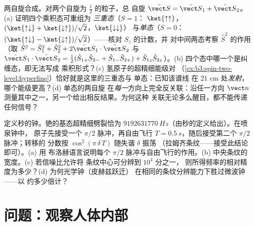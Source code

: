 \begin{exercise}[$\star\star\star$]\label{exo:b3:spin-two-level:11}
两自旋合成。对两个自旋为 $\tfrac12$ 的粒子，总
自旋 $\hat{\vect S} = \hat{\vect S}_1 + \hat{\vect S}_2$。(a) 证明四个乘积态可重组为
\emph{三重态}（$S = 1$：
$\ket{\uparrow\uparrow}$，$(\ket{\uparrow\downarrow} +
\ket{\downarrow\uparrow})/\sqrt2$，$\ket{\downarrow\downarrow}$）
与\emph{单态}（$S = 0$：$(\ket{\uparrow\downarrow} -
\ket{\downarrow\uparrow})/\sqrt2$）——核对 $S_z$ 的计数，并
对中间两态考察 $\hat S^2$ 的作用（取 $\hat
S^2 = \hat S_1^2 + \hat S_2^2 + 2\hat{\vect S}_1\cdot\hat{\vect
S}_2$ 与 $\hat{\vect S}_1\cdot\hat{\vect S}_2 = \tfrac12(\hat
S_{1+}\hat S_{2-} + \hat S_{1-}\hat S_{2+}) + \hat S_{1z}\hat
S_{2z}$）。(b) 四个态中哪一个是纠缠态，即无法写成
乘积形式？(c) 氢原子的超精细能级对
（\cref{ex:b3:spin-two-level:hyperfine}）恰好就是这里的三重态与
单态：已知该谱线
在 21 cm 处\emph{发射}，哪个能级更高？(d) 单态的两自旋
在\emph{每一}方向上完全反关联：沿任一方向
$\vect n$ 测量其中之一，另一个给出相反结果。为何这种
关联无论多么醒目，都不能传递任何信号？
\end{exercise}

\begin{exercise}[$\star\star\star$]\label{exo:b3:spin-two-level:12}
定义秒的钟。铯的基态超精细劈裂恰为
$\qty{9192631770}{Hz}$（由秒的定义给出）。在喷泉钟中，
原子先接受一个 $\pi/2$ 脉冲，再自由飞行
$T = \qty{0.5}{s}$，随后接受第二个 $\pi/2$ 脉冲；转移的
分数按 $\cos^2(\pi\,\delta\,T)$ 随失谐 $\delta$ 振荡
（拉姆齐条纹——接受此结论即可）。(a) 用
布洛赫语言说明每个 $\pi/2$ 脉冲与自由飞行的作用。(b)
中央条纹的宽度。(c) 若信噪比允许将
条纹中心可分辨到 $10^4$ 分之一，
则所得频率的相对精度为多少？(d) 为何光学钟（皮赫兹跃迁）
在相同的条纹分辨能力下胜过微波钟——以
约多少倍计？
\end{exercise}

\section{问题：观察人体内部}

